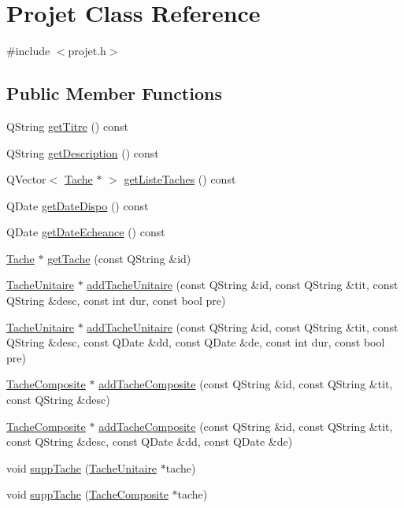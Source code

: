 \hypertarget{class_projet}{}\section{Projet Class Reference}
\label{class_projet}


{\ttfamily \#include $<$projet.\+h$>$}

\subsection*{Public Member Functions}
\begin{DoxyCompactItemize}
\item 
Q\+String \hyperlink{class_projet_aafdae1361272085ee8683738d70d0612}{get\+Titre} () const 
\item 
Q\+String \hyperlink{class_projet_a4b939075b8f652846f8fc6457343219e}{get\+Description} () const 
\item 
Q\+Vector$<$ \hyperlink{class_tache}{Tache} $\ast$ $>$ \hyperlink{class_projet_abc5c0c5980be9a1639651dc23789f068}{get\+Liste\+Taches} () const 
\item 
Q\+Date \hyperlink{class_projet_a226d910000aaecf7e44399f2226496f5}{get\+Date\+Dispo} () const 
\item 
Q\+Date \hyperlink{class_projet_a6a54a69a00cbaebd362e02f8e7dc3803}{get\+Date\+Echeance} () const 
\item 
\hyperlink{class_tache}{Tache} $\ast$ \hyperlink{class_projet_a4bd470370df8fd883386069a90b958e2}{get\+Tache} (const Q\+String \&id)
\item 
\hyperlink{class_tache_unitaire}{Tache\+Unitaire} $\ast$ \hyperlink{class_projet_a3dfe2bda911378a958b57a6684624804}{add\+Tache\+Unitaire} (const Q\+String \&id, const Q\+String \&tit, const Q\+String \&desc, const int dur, const bool pre)
\item 
\hyperlink{class_tache_unitaire}{Tache\+Unitaire} $\ast$ \hyperlink{class_projet_a8434e7255cace66ff199cb0ba6636535}{add\+Tache\+Unitaire} (const Q\+String \&id, const Q\+String \&tit, const Q\+String \&desc, const Q\+Date \&dd, const Q\+Date \&de, const int dur, const bool pre)
\item 
\hyperlink{class_tache_composite}{Tache\+Composite} $\ast$ \hyperlink{class_projet_aa5f49aee0f30445f1e612311848b78ba}{add\+Tache\+Composite} (const Q\+String \&id, const Q\+String \&tit, const Q\+String \&desc)
\item 
\hyperlink{class_tache_composite}{Tache\+Composite} $\ast$ \hyperlink{class_projet_aee6a754a368eb0ea47b2fa7317ea5055}{add\+Tache\+Composite} (const Q\+String \&id, const Q\+String \&tit, const Q\+String \&desc, const Q\+Date \&dd, const Q\+Date \&de)
\item 
void \hyperlink{class_projet_a649b8123c195bc575871576c9f350d14}{supp\+Tache} (\hyperlink{class_tache_unitaire}{Tache\+Unitaire} $\ast$tache)
\item 
void \hyperlink{class_projet_a1af5c7716e8893066418afc5e8c09f3c}{supp\+Tache} (\hyperlink{class_tache_composite}{Tache\+Composite} $\ast$tache)
\end{DoxyCompactItemize}
